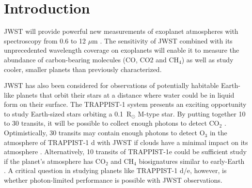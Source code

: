 \documentclass{aastex62}
\begin{document}


\section{Introduction} \label{sec:intro}

JWST will provide powerful new measurements of exoplanet atmospheres with spectroscopy from 0.6 to 12 $\mu$m
\citep{beichman2014pasp,greene2016jwst_trans,howe2017informationJWST,barstow2015jwstSystematics,schlawin2018JWSTforecasts}.
The sensitivity of JWST combined with its unprecedented wavelength coverage on exoplanets will enable it to measure the abundance of carbon-bearing molecules (CO, CO$2$ and CH$_4$) as well as study cooler, smaller planets than previously characterized.

JWST has also been considered for observations of potentially habitable Earth-like planets that orbit their stars at a distance where water could be in liquid form on their surface.
The TRAPPIST-1 system \citep{gillon2016trappist1Discovery,gillon2017trappist-1sevenp} presents an exciting opportunity to study Earth-sized stars orbiting a 0.1~R$_\odot$ M-type star.
By putting together 10 to 30 transits, it will be possible to collect enough photons to detect CO$_2$ \citep{barstow2016trappist1habitable,krissansen-totton2018trappist1eJWST}.
Optimistically, 30 transits may contain enough photons to detect O$_3$ in the atmosphere of TRAPPIST-1 d with JWST if clouds have a minimal impact on its atmosphere \citep{barstow2016trappist1habitable}.
Alternatively, 10 transits of TRAPPIST-1e could be sufficient study if the planet's atmosphere has CO$_2$ and CH$_4$ biosignatures similar to early-Earth \citep{krissansen-totton2018trappist1eJWST}.
A critical question in studying planets like TRAPPIST-1 d/e, however, is whether photon-limited performance is possible with JWST observations.
\end{document}
